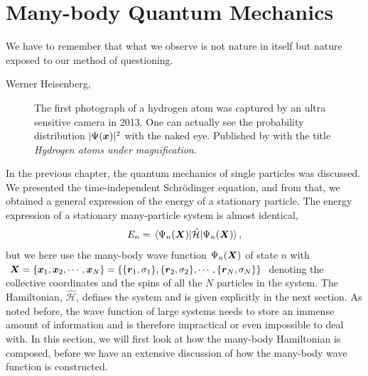 \chapter{Many-body Quantum Mechanics} \label{chp:manybody}
\epigraph{We have to remember that what we observe is not nature in itself but
	nature exposed to our method of questioning.}{Werner Heisenberg, \supercite{heisenberg_across_1990}}
\begin{figure}[H]
	\centering
	\captionsetup[subfigure]{labelformat=empty}
	\caption{The first photograph of a hydrogen atom was captured by an ultra sensitive camera in 2013. One can actually see the probability distribution $|\Psi(\boldsymbol{{x}})|^2$ with the naked eye. Published by \citet{stodolna_hydrogen_2013} with the title \textit{Hydrogen atoms under magnification}.}
\end{figure}

\sloppy
In the previous chapter, the quantum mechanics of single particles was discussed. We presented the time-independent Schrödinger equation, and from that, we obtained a general expression of the energy of a stationary particle. The energy expression of a stationary many-particle system is almost identical,
\begin{equation}
E_n=\mel{\Psi_n(\bs{X})}{\hat{\mathcal{H}}}{\Psi_n(\bs{X})},
\label{eq:energy}
\end{equation}
but we here use the many-body wave function $\Psi_n(\boldsymbol{{X}})$ of state $n$ with $\boldsymbol{{X}}=\{\boldsymbol{{x}}_1,\boldsymbol{{x}}_2,\cdots,\boldsymbol{{x}}_N\}=\{\{\boldsymbol{{r}}_1, \sigma_1\}, \{\boldsymbol{{r}}_2, \sigma_2\},\cdots,\{\boldsymbol{{r}}_N, \sigma_N\}\}$ denoting the collective coordinates and the spins of all the $N$ particles in the system. The Hamiltonian, $\hat{\mathcal{H}}$, defines the system and is given explicitly in the next section. As noted before, the wave function of large systems needs to store an immense amount of information and is therefore impractical or even impossible to deal with. In this section, we will first look at how the many-body Hamiltonian is composed, before we have an extensive discussion of how the many-body wave function is constructed.

